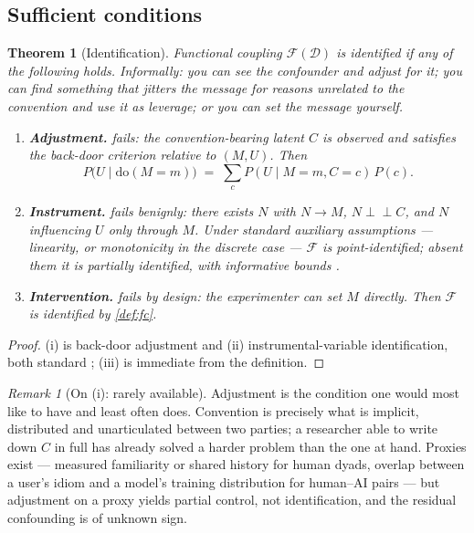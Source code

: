 \documentclass[11pt,a4paper]{article}
\theoremstyle{plain}
\newtheorem{theorem}{Theorem}
\theoremstyle{definition}
\theoremstyle{remark}
\newtheorem{remark}[remark]{Remark}
\newcommand{\Fc}{\mathcal{F}}
\newcommand{\Dy}{\mathcal{D}}
\newcommand{\dop}{\mathrm{do}}
\newcommand{\indep}{\perp\!\!\!\perp}
\begin{document}
\subsection{Sufficient conditions}

\begin{theorem}[Identification]\label{thm:id}
Functional coupling $\Fc(\Dy)$ is identified if any of the following holds. Informally: you can
see the confounder and adjust for it; you can find something that jitters the message for
reasons unrelated to the convention and use it as leverage; or you can set the message
yourself.
\begin{enumerate}[label=(\roman*), leftmargin=1.9em, itemsep=3pt]
    \item \textbf{Adjustment.}  fails: the convention-bearing latent $C$ is
    observed and satisfies the back-door criterion relative to $(M, U)$. Then
    \[
      P\big(U \mid \dop(M{=}m)\big) \;=\; \sum_c P(U \mid M{=}m, C{=}c)\,P(c).
    \]
    \item \textbf{Instrument.}  fails benignly: there exists $N$ with
    $N \to M$, $N \indep C$, and $N$ influencing $U$ only through $M$. Under standard auxiliary
    assumptions --- linearity, or monotonicity in the discrete case
    \citep{angrist1996identification} --- $\Fc$ is point-identified; absent them it is partially
    identified, with informative bounds \citep{balke1997bounds}.
    \item \textbf{Intervention.}  fails by design: the experimenter can set $M$
    directly. Then $\Fc$ is identified by \cref{def:fc}.
\end{enumerate}
\end{theorem}

\begin{proof}
(i) is back-door adjustment and (ii) instrumental-variable identification, both standard
\citep{pearl2009causality, angrist1996identification}; (iii) is immediate from the definition.
\end{proof}

\begin{remark}[On (i): rarely available]\label{rem:adjustment}
Adjustment is the condition one would most like to have and least often does. Convention is
precisely what is implicit, distributed and unarticulated between two parties; a researcher
able to write down $C$ in full has already solved a harder problem than the one at hand.
Proxies exist --- measured familiarity or shared history for human dyads, overlap between a
user's idiom and a model's training distribution for human--AI pairs --- but adjustment on a
proxy yields partial control, not identification, and the residual confounding is of unknown
sign.
\end{remark}
\end{document}
